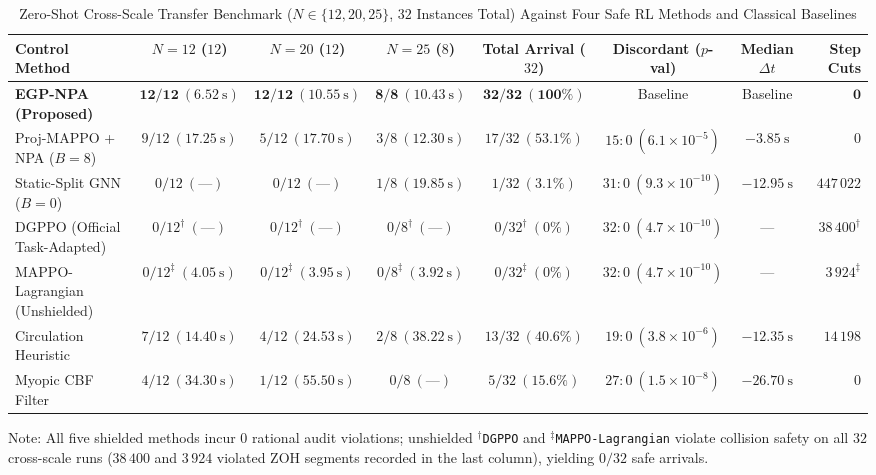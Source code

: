 \begin{table}[t]
 \centering\footnotesize
 \caption{Zero-Shot Cross-Scale Transfer Benchmark ($N\in\{12,20,25\}$, $32$ Instances Total) Against Four Safe RL Methods and Classical Baselines}\label{tab:e2}
 \begin{tabularx}{\textwidth}{@{}Xccccccr@{}}
 \toprule
 Control Method & $N=12$ ($12$) & $N=20$ ($12$) & $N=25$ ($8$) & Total Arrival ($32$) & Discordant ($p$-val) & Median $\Delta t$ & Step Cuts\\
 \midrule
 \textbf{EGP-NPA (Proposed)} & $\mathbf{12/12\ (6.52\ \mathrm s)}$ & $\mathbf{12/12\ (10.55\ \mathrm s)}$ & $\mathbf{8/8\ (10.43\ \mathrm s)}$ & $\mathbf{32/32\ (100\%)}$ & Baseline & Baseline & $\mathbf{0}$\\
 Proj-MAPPO + NPA \cite{wabersich2021,liu2026saferl} ($B=8$) & $9/12\ (17.25\ \mathrm s)$ & $5/12\ (17.70\ \mathrm s)$ & $3/8\ (12.30\ \mathrm s)$ & $17/32\ (53.1\%)$ & $15:0\ (6.1\times 10^{-5})$ & $-3.85\ \mathrm s$ & $0$\\
 Static-Split GNN \cite{ames2017cbf,zhang2025gcbf} ($B=0$) & $0/12\ (\text{---})$ & $0/12\ (\text{---})$ & $1/8\ (19.85\ \mathrm s)$ & $1/32\ (3.1\%)$ & $31:0\ (9.3\times 10^{-10})$ & $-12.95\ \mathrm s$ & $447\,022$\\
 DGPPO \cite{zhang2025dgppo} (Official Task-Adapted) & $0/12^\dagger\ (\text{---})$ & $0/12^\dagger\ (\text{---})$ & $0/8^\dagger\ (\text{---})$ & $0/32^\dagger\ (0\%)$ & $32:0\ (4.7\times 10^{-10})$ & --- & $38\,400^\dagger$\\
 MAPPO-Lagrangian \cite{gu2023safe} (Unshielded) & $0/12^\ddagger\ (4.05\ \mathrm s)$ & $0/12^\ddagger\ (3.95\ \mathrm s)$ & $0/8^\ddagger\ (3.92\ \mathrm s)$ & $0/32^\ddagger\ (0\%)$ & $32:0\ (4.7\times 10^{-10})$ & --- & $3\,924^\ddagger$\\
 Circulation Heuristic \cite{goncalves2023circulation} & $7/12\ (14.40\ \mathrm s)$ & $4/12\ (24.53\ \mathrm s)$ & $2/8\ (38.22\ \mathrm s)$ & $13/32\ (40.6\%)$ & $19:0\ (3.8\times 10^{-6})$ & $-12.35\ \mathrm s$ & $14\,198$\\
 Myopic CBF Filter \cite{ames2017cbf,reis2021} & $4/12\ (34.30\ \mathrm s)$ & $1/12\ (55.50\ \mathrm s)$ & $0/8\ (\text{---})$ & $5/32\ (15.6\%)$ & $27:0\ (1.5\times 10^{-8})$ & $-26.70\ \mathrm s$ & $0$\\
 \bottomrule
 \end{tabularx}
 \vspace{1.5pt}
 \par\raggedright\scriptsize Note: All five shielded methods incur $0$ rational audit violations; unshielded $^\dagger$\texttt{DGPPO} and $^\ddagger$\texttt{MAPPO-Lagrangian} violate collision safety on all $32$ cross-scale runs ($38\,400$ and $3\,924$ violated ZOH segments recorded in the last column), yielding $0/32$ safe arrivals.
\end{table}

